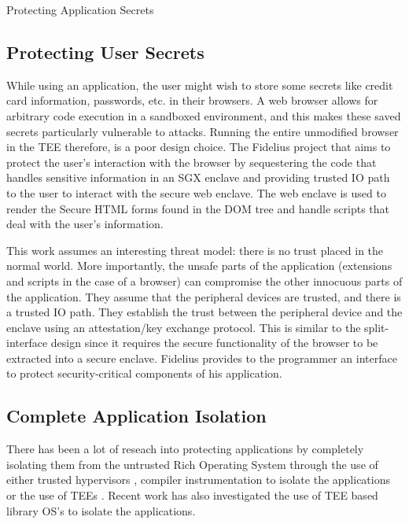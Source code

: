 \begin{subsection}{Protecting Application Secrets}
\subsection{Protecting User Secrets}
While using an application, the user might wish to store some secrets like
credit card information, passwords, etc. in their browsers. A web browser
allows for arbitrary code execution in a sandboxed environment, and this
makes these saved secrets particularly vulnerable to attacks. Running the
entire unmodified browser in the TEE therefore, is a poor design choice.
The Fidelius \cite{Fidelius_SP2018} project that aims to protect the user's
interaction with the browser by sequestering the code that handles sensitive
information in an SGX enclave and providing trusted IO path to the user to
interact with the secure web enclave. The web enclave is used to render the
Secure HTML forms found in the DOM tree and handle scripts that deal with
the user's information. 

This work assumes an interesting threat model: there is no trust placed in
the normal world. More importantly, the unsafe parts of the application
(extensions and scripts in the case of a browser) can compromise the other
innocuous parts of the application. They assume that the peripheral devices
are trusted, and there is a trusted IO path. They establish the trust
between the peripheral device and the enclave using an attestation/key
exchange protocol. This is similar to the split-interface design since it
requires the secure functionality of the browser to be extracted into a
secure enclave. Fidelius provides to the programmer an interface to protect
security-critical components of his application. 
    
  
\subsection{Complete Application Isolation}
There has been a lot of reseach into protecting applications by completely
isolating them from the untrusted Rich Operating System through the use of
either trusted hypervisors \cite{hofmann2013inktag,SP3,chen2008overshadow},
compiler instrumentation to isolate the applications
\cite{criswell2014virtual} or the use of TEEs
\cite{baumann2015shielding,guan17trustshadow}. Recent work
\cite{TsaiGraphene2014, tsai2017graphene} has also investigated the use of
TEE based library OS's to isolate the applications. 


\end{subsection}
